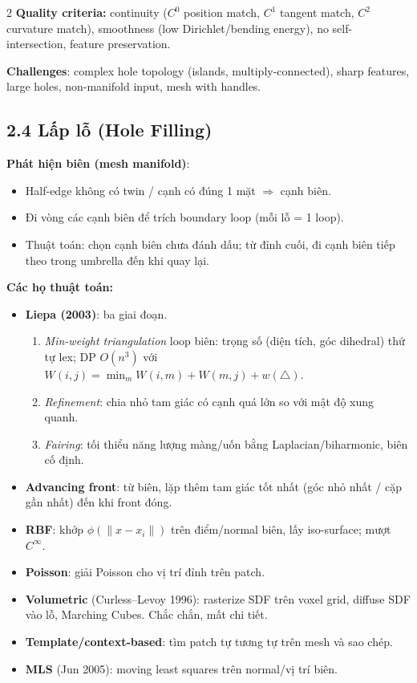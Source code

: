 \begin{paracol}{2}
\textbf{Quality criteria:} continuity ($C^0$ position match, $C^1$ tangent match, $C^2$ curvature match), smoothness (low Dirichlet/bending energy), no self-intersection, feature preservation.

\textbf{Challenges}: complex hole topology (islands, multiply-connected), sharp features, large holes, non-manifold input, mesh with handles.

\switchcolumn

\subsection*{2.4 Lấp lỗ (Hole Filling)}

\textbf{Phát hiện biên (mesh manifold)}:
\begin{itemize}[leftmargin=*,nosep]
  \item Half-edge không có twin / cạnh có đúng 1 mặt $\Rightarrow$ cạnh biên.
  \item Đi vòng các cạnh biên để trích boundary loop (mỗi lỗ = 1 loop).
  \item Thuật toán: chọn cạnh biên chưa đánh dấu; từ đỉnh cuối, đi cạnh biên tiếp theo trong umbrella đến khi quay lại.
\end{itemize}

\textbf{Các họ thuật toán:}
\begin{itemize}[leftmargin=*,nosep]
  \item \textbf{Liepa (2003)}: ba giai đoạn.
    \begin{enumerate}[leftmargin=1.2em,nosep]
      \item \emph{Min-weight triangulation} loop biên: trọng số (diện tích, góc dihedral) thứ tự lex; DP $O(n^3)$ với $W(i,j)=\min_m W(i,m)+W(m,j)+w(\triangle)$.
      \item \emph{Refinement}: chia nhỏ tam giác có cạnh quá lớn so với mật độ xung quanh.
      \item \emph{Fairing}: tối thiểu năng lượng màng/uốn bằng Laplacian/biharmonic, biên cố định.
    \end{enumerate}
  \item \textbf{Advancing front}: từ biên, lặp thêm tam giác tốt nhất (góc nhỏ nhất / cặp gần nhất) đến khi front đóng.
  \item \textbf{RBF}: khớp $\phi(\|x-x_i\|)$ trên điểm/normal biên, lấy iso-surface; mượt $C^\infty$.
  \item \textbf{Poisson}: giải Poisson cho vị trí đỉnh trên patch.
  \item \textbf{Volumetric} (Curless–Levoy 1996): rasterize SDF trên voxel grid, diffuse SDF vào lỗ, Marching Cubes. Chắc chắn, mất chi tiết.
  \item \textbf{Template/context-based}: tìm patch tự tương tự trên mesh và sao chép.
  \item \textbf{MLS} (Jun 2005): moving least squares trên normal/vị trí biên.
\end{itemize}


\end{paracol}
